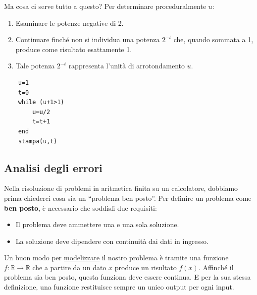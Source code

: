 \documentclass{article}
\begin{document}
Ma cosa ci serve tutto a questo? Per determinare proceduralmente $u$:
\begin{enumerate}
    \item Esaminare le potenze negative di 2.
    \item Continuare finché non si individua una potenza $2^{-t}$ che, quando sommata a 1,
        produce come risultato esattamente 1.
    \item Tale potenza $2^{-t}$ rappresenta l'unità di arrotondamento $u$.
\end{enumerate}
\begin{verbatim}
    u=1
    t=0
    while (u+1>1)
        u=u/2
        t=t+1
    end 
    stampa(u,t)
\end{verbatim}
\subsection{Analisi degli errori}
Nella risoluzione di problemi in aritmetica finita su un calcolatore, dobbiamo
prima chiederci cosa sia un ``problema ben posto''. Per definire un problema come 
\textbf{ben posto}, è necessario che soddisfi due requisiti:
\begin{itemize}
    \item Il problema deve ammettere una e
        una sola soluzione.
    \item La soluzione deve dipendere con
        continuità dai dati in ingresso.
\end{itemize}
Un buon modo per \underline{modelizzare} il nostro problema è tramite una funzione 
$f:\mathbb{R}\rightarrow \mathbb{R}$ che a partire da un dato $x$ produce un
risultato $f(x)$. Affinché il problema sia ben
posto, questa funziona deve essere continua. E per la sua stessa
definizione, una funzione restituisce sempre un unico output per ogni input.
\end{document}
